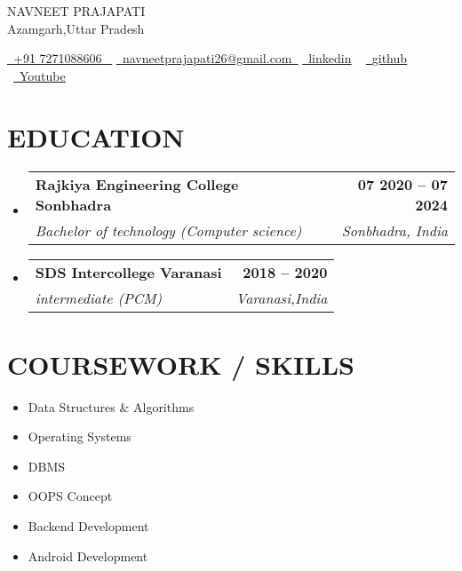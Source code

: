 \documentclass[letterpaper,11pt]{article}
\makeatletter
\newcommand{\resumeSubheading}[4]{
  \vspace{-2pt}\item
    \begin{tabular*}{1.0\textwidth}[t]{l@{\extracolsep{\fill}}r}
      \textbf{\large#1} & \textbf{\small #2} \\
      \textit{\large#3} & \textit{\small #4} \\
      
    \end{tabular*}\vspace{-7pt}
}
\newcommand{\resumeSubHeadingListStart}{\begin{itemize}[leftmargin=0.0in, label={}]}
\newcommand{\resumeSubHeadingListEnd}{\end{itemize}}
\makeatother
\begin{document}


\begin{center}
    {\Huge \scshape NAVNEET PRAJAPATI} \\ \vspace{1pt}
    Azamgarh,Uttar Pradesh \\ \vspace{1pt}
    \small 
    
    \href{tel:+91 7271088606}{ \raisebox{-0.1\height}\faPhone\ \underline{+91 7271088606} ~} \href{navneetprajapati26@gmail.com}{\raisebox{-0.2\height}\faEnvelope\  \underline{navneetprajapati26@gmail.com}~}
    \href{https://www.linkedin.com/in/navneetprajapati26/}{\raisebox{-0.2\height}\faLinkedinSquare\ \underline{linkedin}} ~
    \href{https://github.com/navneetprajapati26}{\raisebox{-0.2\height}\faGithub\ \underline{github}} ~\href{https://www.youtube.com/@asyncapp}{\raisebox{-0.2\height}\faYoutube\ \underline{Youtube}} ~
    
    
    \vspace{-pt}
\end{center}

\section{EDUCATION}
  \resumeSubHeadingListStart
    \resumeSubheading
      {Rajkiya Engineering College Sonbhadra}{07 2020 -- 07 2024}
      {Bachelor of technology (Computer science) }{Sonbhadra, India}
  \resumeSubHeadingListEnd
  
  \resumeSubHeadingListStart
    \resumeSubheading
      {SDS Intercollege Varanasi}{2018 -- 2020}
      {intermediate (PCM)  }{Varanasi,India}
  \resumeSubHeadingListEnd

\section{COURSEWORK / SKILLS}
        \begin{multicols}{4}
            \begin{itemize}[itemsep=-2pt, parsep=5pt]
                \item Data Structures \& Algorithms
                \item Operating Systems
                \item DBMS
                \item OOPS Concept
                \item Backend Development 
                \item Android Development
            \end{itemize}
        \end{multicols}
        \vspace*{2.0\multicolsep}
\end{document}
